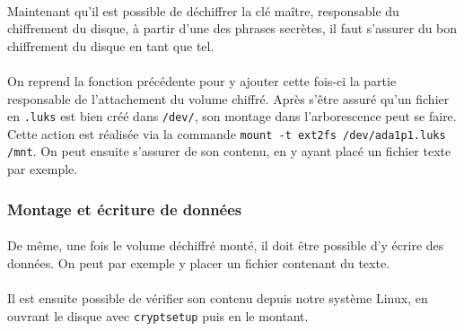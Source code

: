 \paragraph{}
Maintenant qu'il est possible de déchiffrer la clé maître, responsable du
chiffrement du disque, à partir d'une des phrases secrètes, il faut s'assurer du
bon chiffrement du disque en tant que tel.
\paragraph{}
On reprend la fonction précédente pour y ajouter cette fois-ci la partie
responsable de l'attachement du volume chiffré. Après s'être assuré qu'un
fichier en \texttt{.luks} est bien créé dans \texttt{/dev/}, son montage dans
l'arborescence peut se faire. Cette action est réalisée via la commande
\texttt{mount -t ext2fs /dev/ada1p1.luks /mnt}. On peut ensuite s'assurer de son
contenu, en y ayant placé un fichier texte par exemple.

\subsubsection{Montage et écriture de données}
\paragraph{}
De même, une fois le volume déchiffré monté, il doit être possible d'y écrire
des données. On peut par exemple y placer un fichier contenant du texte.
\paragraph{}
Il est ensuite possible de vérifier son contenu depuis notre système Linux, en
ouvrant le disque avec \texttt{cryptsetup} puis en le montant.